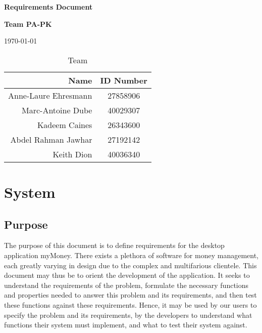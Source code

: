 \documentclass[11pt]{article}
\newcounter{use case ID}
\newcounter{req ID}
\begin{document}
\vspace*{0.5in}
\centerline{\bf\Large Requirements Document}

\vspace*{0.5in}
\centerline{\bf\Large Team PA-PK}

\vspace*{0.5in}
\centerline{\today}

\vspace*{1.5in}
\begin{table}[htbp]
\caption{Team}
\begin{center}
\begin{tabular}{|r | c|}
\hline
Name & ID Number \\
\hline\hline
Anne-Laure Ehresmann & 27858906 \\
\hline
Marc-Antoine Dube & 40029307 \\
\hline
Kadeem Caines & 26343600 \\
\hline
Abdel Rahman Jawhar & 27192142 \\
\hline
Keith Dion & 40036340 \\
\hline
\end{tabular}
\end{center}
\end{table}

\tableofcontents
\listoffigures
\listoftables

\clearpage

\section{System}\subsection{Purpose}

The purpose of this document is to define requirements for the  desktop application myMoney.
There exists a plethora of software for money management, each greatly varying in design due to the complex and multifarious clientele. This document may thus be to orient the development of the application. It seeks to understand the requirements of the problem, formulate the necessary functions and properties needed to answer this problem and its requirements, and then test these functions against these requirements. Hence, it may be used by our users to specify the problem and its requirements, by the developers to understand what functions their system must implement, and what to test their system against.
\end{document}
